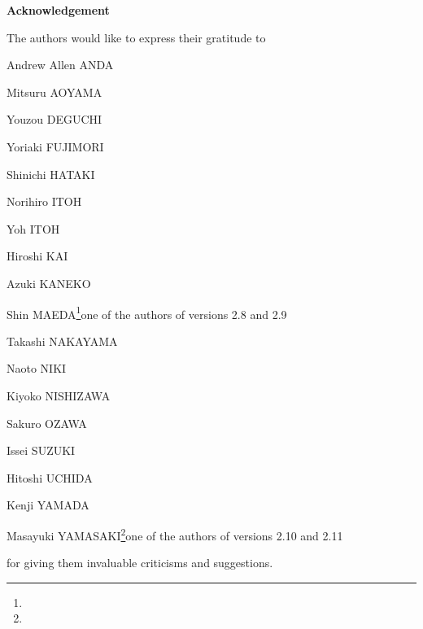 
\centerline{\bf Acknowledgement}

\bigskip

\noindent
The authors would like to express their gratitude to

Andrew Allen ANDA

Mitsuru AOYAMA

Youzou DEGUCHI

Yoriaki FUJIMORI

Shinichi HATAKI{\dag}

Norihiro ITOH

Yoh ITOH

Hiroshi KAI

Azuki KANEKO

Shin MAEDA\footnote{\dag}{one of the authors of versions 2.8 and 2.9}

Takashi NAKAYAMA

Naoto NIKI

Kiyoko NISHIZAWA

Sakuro OZAWA

Issei SUZUKI

Hitoshi UCHIDA

Kenji YAMADA

Masayuki YAMASAKI\footnote{\ddag}{one of the authors of versions 2.10 and 2.11}

\noindent
for giving them invaluable criticisms and suggestions.
